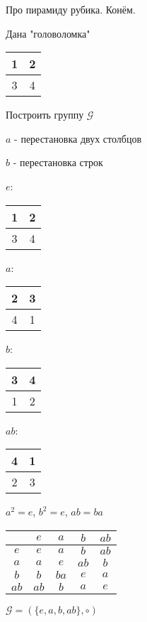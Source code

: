 \documentclass[../main/document.tex]{subfiles}
\begin{document}
\begin{exm}
Про пирамиду рубика. Конём.
\end{exm}

\begin{exm}
Дана "головоломка"

\begin{table}[H]
\renewcommand*{\arraystretch}{1.4}
\begin{tabular}{|c|c|}
\hline
1 & 2\\\hline
3 & 4\\
\hline
\end{tabular}
\end{table}
Построить группу $\mathcal{G}$


$a$ - перестановка двух столбцов

$b$ - перестановка строк

\begin{table}[H]
$e$:
\begin{tabular}{|c|c|}
\hline
1 & 2\\\hline
3 & 4\\
\hline
\end{tabular}
$a$:
\begin{tabular}{|c|c|}
\hline
2 & 3\\\hline
4 & 1\\
\hline
\end{tabular}
$b$:
\begin{tabular}{|c|c|}
\hline
3 & 4\\\hline
1 & 2\\
\hline
\end{tabular}
$ab$:
\begin{tabular}{|c|c|}
\hline
4 & 1\\\hline
2 & 3\\
\hline
\end{tabular}
\end{table}

$a^2=e$, $b^2=e$, $ab=ba$
\begin{table}[H]
\centering
\begin{tabular}{c|c|c|c|c}
 & $e$& $a$&$b$&$ab$\\\hline
$e$& $e$& $a$&$b$&$ab$\\\hline 
$a$& $a$& $e$&$ab$&$b$\\\hline 
$b$& $b$& $ba$&$e$&$a$\\\hline 
$ab$& $ab$& $b$&$a$&$e$\\ 
\end{tabular}
\end{table}

$\mathcal{G}=(\{e,a,b,ab\},\circ)$
\end{exm}
\end{document}
